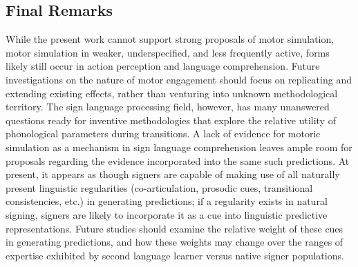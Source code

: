     \subsection{Final Remarks}
        While the present work cannot support strong proposals of motor simulation, motor simulation in weaker, underspecified, and less frequently active, forms likely still occur in action perception and language comprehension. Future investigations on the nature of motor engagement should focus on replicating and extending existing effects, rather than venturing into unknown methodological territory. The sign language processing field, however, has many unanswered questions ready for inventive methodologies that explore the relative utility of phonological parameters during transitions. A lack of evidence for motoric simulation as a mechanism in sign language comprehension leaves ample room for proposals regarding the evidence incorporated into the same such predictions. At present, it appears as though signers are capable of making use of all naturally present linguistic regularities (co-articulation, prosodic cues, transitional consistencies, etc.) in generating predictions; if a regularity exists in natural signing, signers are likely to incorporate it as a cue into linguistic predictive representations. Future studies should examine the relative weight of these cues in generating predictions, and how these weights may change over the ranges of expertise exhibited by second language learner versus native signer populations.
